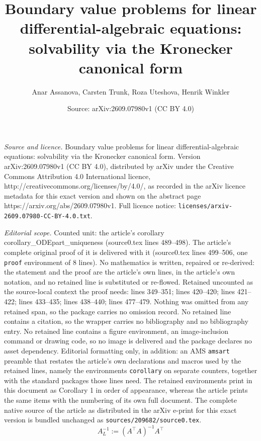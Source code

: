 \documentclass[10pt,a4paper]{amsart}
\title{Boundary value problems for linear differential-algebraic equations: solvability via the Kronecker canonical form}
\author{Anar Assanova, Carsten Trunk, Roza Uteshova, Henrik Winkler}
\date{Source: arXiv:2609.07980v1 (CC BY 4.0)}
\begin{document}
\maketitle

\noindent\emph{Source and licence.} Boundary value problems for linear differential-algebraic equations: solvability via the Kronecker canonical form. Version arXiv:2609.07980v1 (CC BY 4.0), distributed by arXiv under the Creative Commons Attribution 4.0 International licence, http://creativecommons.org/licenses/by/4.0/, as recorded in the arXiv licence metadata for this exact version and shown on the abstract page https://arxiv.org/abs/2609.07980v1. Full licence notice: \texttt{licenses/arxiv-2609.07980-CC-BY-4.0.txt}.\par\smallskip

\noindent\textit{Editorial scope.} Counted unit: the article's corollary corollary\_ODEpart\_uniqueness (source0.tex lines 489--498). The article's complete original proof of it is delivered with it (source0.tex lines 499--506, one \texttt{proof} environment of 8 lines). No mathematics is written, repaired or re-derived: the statement and the proof are the article's own lines, in the article's own notation, and no retained line is substituted or re-flowed.  Retained uncounted as the source-local context the proof needs: lines 349--351; lines 420--420; lines 421--422; lines 433--435; lines 438--440; lines 477--479.  Nothing was omitted from any retained span, so the package carries no omission record.  No retained line contains a citation, so the wrapper carries no bibliography and no bibliography entry.  No retained line contains a figure environment, an image-inclusion command or drawing code, so no image is delivered and the package declares no asset dependency.  Editorial formatting only, in addition: an AMS \texttt{amsart} preamble that restates the article's own declarations and macros used by the retained lines, namely the environments \texttt{corollary} on separate counters, together with the standard packages those lines need.  The retained environments print in this document as Corollary 1 in order of appearance, whereas the article prints the same items with the numbering of its own full document.  The complete native source of the article as distributed in the arXiv e-print for this exact version is bundled unchanged as \texttt{sources/209682/source0.tex}.
\begin{equation}\label{Alina}
A_L^{-1} :=(A^\top A)^{-1}A^\top
\end{equation}
\end{document}
